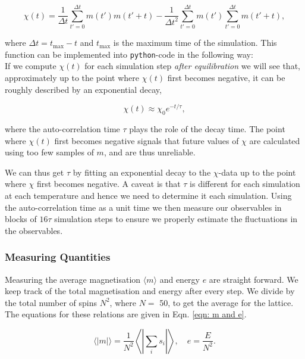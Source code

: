 \documentclass{IAYCPro}
\begin{document}
\begin{equation}
    \chi(t) = \frac{1}{\Delta t}\sum_{t'=0}^{\Delta t} m(t')m(t'+t) - \frac{1}{\Delta t^2} \sum_{t'=0}^{\Delta t} m(t')\sum_{t'=0}^{\Delta t}m(t'+t),
\end{equation}

where $\Delta t = t_\mathrm{max} - t$ and $t_\mathrm{max}$ is the maximum time of the simulation. This function can be implemented into \texttt{python}-code in the following way:
\\
 

If we compute $\chi(t)$ for each simulation step \textit{after equilibration} we will see that, approximately up to the point where $\chi(t)$ first becomes negative, it can be roughly described by an exponential decay,

\begin{equation}
    \chi(t) \approx \chi_0 e^{-t/\tau},
\end{equation}

where the auto-correlation time $\tau$ plays the role of the decay time. The point where $\chi(t)$ first becomes negative signals that future values of $\chi$ are calculated using too few samples of $m$, and are thus unreliable. 

We can thus get $\tau$ by fitting an exponential decay to the $\chi$-data up to the point where $\chi$ first becomes negative. A caveat is that $\tau$ is different for each simulation at each temperature and hence we need to determine it each simulation. Using the auto-correlation time as a unit time we then measure our observables in blocks of $16\tau$ simulation steps to ensure we properly estimate the fluctuations in the observables. 

\raggedbottom
\newpage

\subsubsection{Measuring Quantities}
Measuring the average magnetisation $\langle m \rangle$ and energy $e$ are straight forward. We keep track of the total magnetisation and energy after every step. We divide by the total number of spins $N^2$, where $N=$ 50, to get the average for the lattice. The equations for these relations are given in Eqn. \ref{eqn: m and e}.

\begin{equation}
\langle | m | \rangle = \frac{1}{N^2}\left\langle\left| \sum_{i}s_i\right|\right\rangle,\quad     e = \frac{E}{N^2}.
\label{eqn: m and e}
\end{equation}
\end{document}
